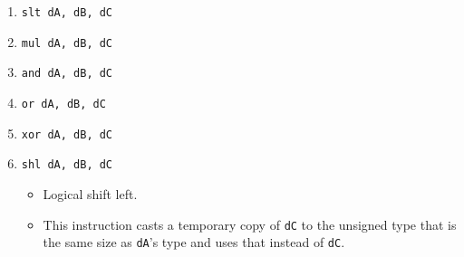 \documentclass{article}
\begin{document}
\begin{itemize}
\begin{enumerate}
			\item \texttt{slt dA, dB, dC}
			\item \texttt{mul dA, dB, dC}

			\item \texttt{and dA, dB, dC}
			\item \texttt{or dA, dB, dC}
			\item \texttt{xor dA, dB, dC}
			\item \texttt{shl dA, dB, dC}
				\begin{itemize}
				\item Logical shift left.
				\item This instruction casts a temporary copy of
					\texttt{dC} to the unsigned type that is the same size
					as \texttt{dA}'s type and uses that instead of
					\texttt{dC}.
				\end{itemize}


\end{enumerate}
\end{itemize}
\end{document}
